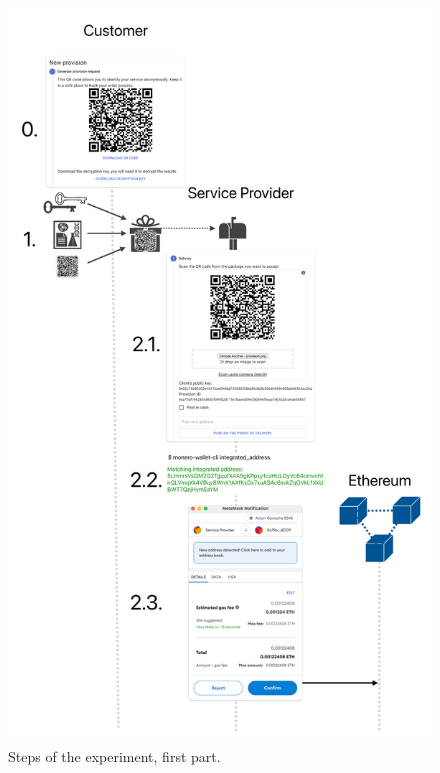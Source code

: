 \documentclass[pdftex,twocolumn,epjc3]{svjour3}
\begin{document}
{\begin{figure}
  \includegraphics[height=0.95\textheight,keepaspectratio]{anonser-experiment1.pdf}
  \caption{Steps of the experiment, first part.}\label{fig:anonser-experiment1}
\end{figure}

}
\end{document}
